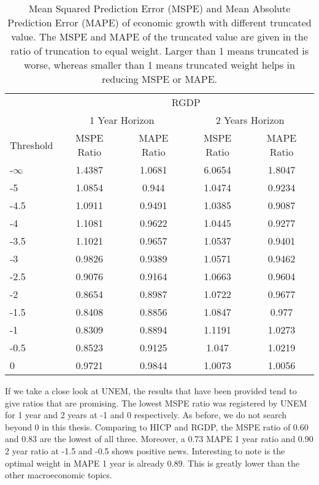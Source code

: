 \documentclass[11pt]{article}
\begin{document}
\begin{table}[!h]
	\centering
	\caption{Mean Squared Prediction Error (MSPE) and Mean Absolute Prediction Error (MAPE) of economic growth with different truncated value. The MSPE and MAPE of the truncated value are given in the ratio of truncation to equal weight. Larger than 1 means truncated is worse, whereas smaller than 1 means truncated weight helps in reducing MSPE or MAPE.}
	\label{tab: c MSPE RGDP}
	\begin{tabular}{lcccc}
		\hline\hline
		&                        \multicolumn{4}{c}{RGDP}                         \\
		\cmidrule(lr){2-5}                              & \multicolumn{2}{c}{1 Year Horizon} & \multicolumn{2}{c}{2 Years Horizon} \\
		\cmidrule(lr){2-3} \cmidrule(lr){4-5}
		Threshold & MSPE Ratio &    MAPE Ratio    & MSPE Ratio &    MAPE Ratio    \\ \hline
-$\infty$ & 1.4387 & 1.0681 & 6.0654 & 1.8047\\ 
-5 & 1.0854 & 0.944 & 1.0474 & 0.9234\\ 
-4.5 & 1.0911 & 0.9491 & 1.0385 & 0.9087\\ 
-4 & 1.1081 & 0.9622 & 1.0445 & 0.9277\\ 
-3.5 & 1.1021 & 0.9657 & 1.0537 & 0.9401\\ 
-3 & 0.9826 & 0.9389 & 1.0571 & 0.9462\\ 
-2.5 & 0.9076 & 0.9164 & 1.0663 & 0.9604\\ 
-2 & 0.8654 & 0.8987 & 1.0722 & 0.9677\\ 
-1.5 & 0.8408 & 0.8856 & 1.0847 & 0.977\\ 
-1 & 0.8309 & 0.8894 & 1.1191 & 1.0273\\ 
-0.5 & 0.8523 & 0.9125 & 1.047 & 1.0219\\ 
0 & 0.9721 & 0.9844 & 1.0073 & 1.0056\\ 
		\hline\hline
	\end{tabular}
\end{table}

If we take a close look at UNEM, the results that have been provided tend to give ratios that are promising. The lowest MSPE ratio was registered by UNEM for 1 year and 2 years at -1 and 0 respectively. As before, we do not search beyond 0 in this thesis. Comparing to HICP and RGDP, the MSPE ratio of 0.60 and 0.83 are the lowest of all three.  Moreover, a 0.73 MAPE 1 year ratio and 0.90 2 year ratio at -1.5 and -0.5 shows positive news. Interesting to note is the optimal weight in MAPE 1 year is already 0.89. This is greatly lower than the other macroeconomic topics.
\end{document}
